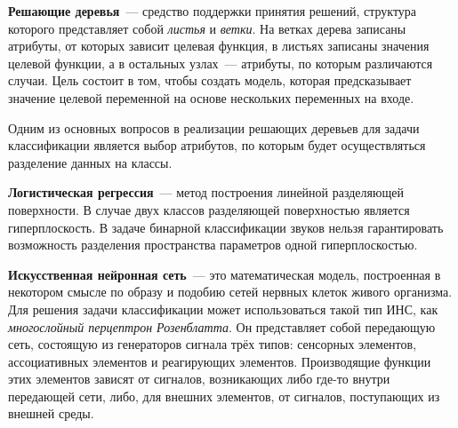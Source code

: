 	\textbf{Решающие деревья}~--- средство поддержки принятия решений, структура которого представляет собой \textit{листья} и \textit{ветки}.
    На ветках дерева записаны атрибуты, от которых зависит целевая функция, в листьях записаны значения целевой функции,
    а в остальных узлах~--- атрибуты, по которым различаются случаи. Цель состоит в том, чтобы создать модель,
    которая предсказывает значение целевой переменной на основе нескольких переменных на входе.

    Одним из основных вопросов в реализации решающих деревьев для задачи классификации является выбор атрибутов,
    по которым будет осуществляться разделение данных на классы.

    \textbf{Логистическая регрессия}~--- метод построения линейной разделяющей поверхности.
    В случае двух классов разделяющей поверхностью является гиперплоскость.
    В задаче бинарной классификации звуков нельзя гарантировать возможность разделения пространства параметров
    одной гиперплоскостью.

    \textbf{Искусственная нейронная сеть}~--- это математическая модель, построенная в некотором смысле по образу
    и подобию сетей нервных клеток живого организма. Для решения задачи классификации может использоваться
    такой тип ИНС, как \textit{многослойный перцептрон Розенблатта}.
    Он представляет собой передающую сеть, состоящую из генераторов сигнала трёх типов: сенсорных элементов,
    ассоциативных элементов и реагирующих элементов. Производящие функции этих элементов зависят от сигналов, возникающих либо где-то внутри передающей сети,
    либо, для внешних элементов, от сигналов, поступающих из внешней среды.